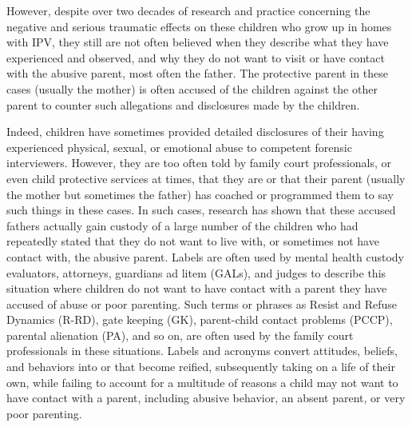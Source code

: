 However, despite over two decades of research and practice concerning the negative and serious traumatic effects on these children who
grow up in homes with IPV, they still are not often believed when they
describe what they have experienced and observed, and why they do not
want to visit or have contact with the abusive parent, most often the father. The protective parent in these cases (usually the mother) is often
accused of  the children against the other parent to counter
such allegations and disclosures made by the children. \pfl{}

Indeed, children have sometimes provided detailed disclosures of 
their having experienced 
physical, sexual, or emotional abuse to competent forensic 
interviewers. However, they are too often told
by family court professionals, or even child protective services at times,
that they are  or that their parent (usually the mother but
sometimes the father) has coached or programmed them to say such
things in these cases. In such cases, research has shown that these accused fathers actually gain custody of a large number of the children
who had repeatedly stated that they do not want to live with, or sometimes not have contact with, the abusive parent. Labels are often used by
mental health custody evaluators, attorneys, guardians ad litem (GALs),
and judges to describe this situation where children do not want to have
contact with a parent they have accused of abuse or poor parenting. Such
terms or phrases as Resist and Refuse Dynamics (R-RD), gate keeping (GK), 
parent-child contact problems (PCCP), parental alienation
(PA), and so on, are often used by the family court professionals in these
situations. Labels and acronyms convert attitudes, beliefs, and behaviors
into  or  that become reified, subsequently taking
on a life of their own, while failing to account for a multitude of reasons
a child may not want to have contact with a parent, including abusive
behavior, an absent parent, or very poor parenting. \pfl{}\newpage{}

